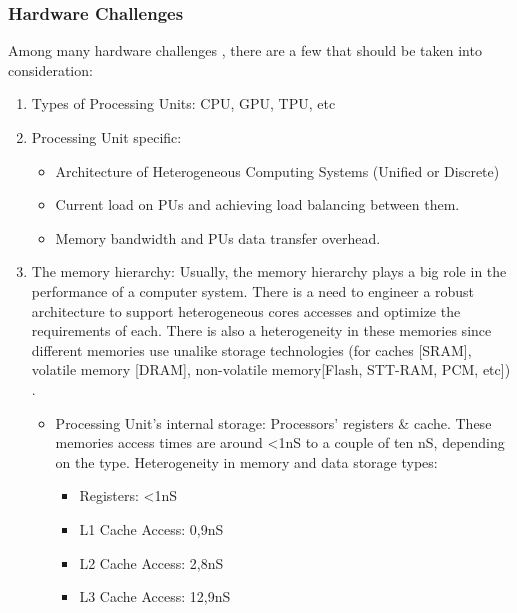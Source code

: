         \subsubsection{Hardware Challenges}
            Among many hardware challenges \cite{mittal_survey_2015, zahran_heterogeneous_2017}, there are a few that should be taken into consideration:
            
            \begin{enumerate}
                \item Types of Processing Units: CPU, GPU, TPU, etc
                \item Processing Unit specific:
                    \begin{itemize}
                        \item Architecture of Heterogeneous Computing Systems (Unified or Discrete)
                        \item Current load on PUs and achieving load balancing between them.
                        \item Memory bandwidth and PUs data transfer overhead.
                    \end{itemize}
                
                \item The memory hierarchy: Usually, the memory hierarchy plays a big role in the performance of a computer system. There is a need to engineer a robust architecture to support heterogeneous cores accesses and optimize the requirements of each. There is also a heterogeneity in these memories since different memories use unalike storage technologies (for caches [SRAM], volatile memory [DRAM], non-volatile memory[Flash, STT-RAM, PCM, etc]) \cite{meena_overview_2014}.
 
                    \begin{itemize}
                        \item Processing Unit's internal storage: Processors' registers \& cache. These memories access times \cite{mistretta_microns_nodate} are around <1nS to a couple of ten nS, depending on the type. Heterogeneity in memory and data storage types:
                        
                            \begin{itemize}
                                \item Registers: <1nS
                                \item L1 Cache Access: 0,9nS
                                \item L2 Cache Access: 2,8nS
                                \item L3 Cache Access: 12,9nS
                            \end{itemize}
                        

\end{itemize}
\end{enumerate}

